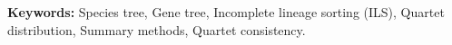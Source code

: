 \documentclass[10pt,a4paper]{article}
\providecommand{\keywords}[1]{\textbf{\textit{Keywords:}} #1}
\begin{document}
\begin{abstract}






\end{abstract}


\textbf{Keywords:} Species tree, Gene tree, Incomplete lineage sorting (ILS), Quartet distribution, Summary methods, Quartet consistency.

% 

\clearpage
{}
\linenumbers
\doublespacing






\end{document}
